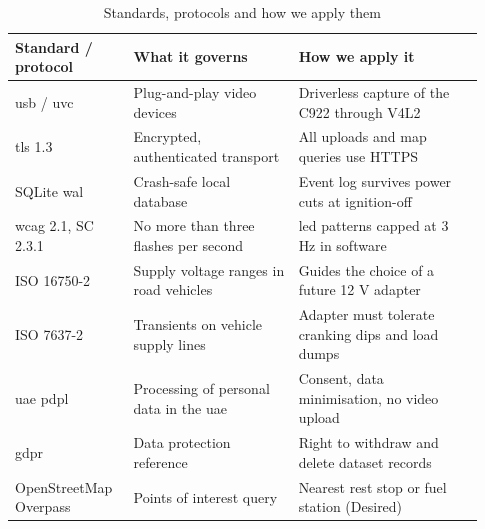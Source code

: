 \begin{table}[htbp]
\centering
\caption{Standards, protocols and how we apply them}
\label{tab:ch3-02}
\footnotesize
\setlength{\tabcolsep}{3pt}
\renewcommand{\arraystretch}{1.15}
\begin{tabular}{|p{0.230\linewidth}|p{0.330\linewidth}|p{0.370\linewidth}|}
\hline
\textbf{Standard / protocol} & \textbf{What it governs} & \textbf{How we apply it} \\
\hline
\gls{usb} / \gls{uvc} \cite{r60} & Plug-and-play video devices & Driverless capture of the C922 through V4L2 \\
\hline
\gls{tls} 1.3 \cite{r54} & Encrypted, authenticated transport & All uploads and map queries use HTTPS \\
\hline
SQLite \gls{wal} \cite{r53} & Crash-safe local database & Event log survives power cuts at ignition-off \\
\hline
\gls{wcag} 2.1, SC 2.3.1 \cite{r55} & No more than three flashes per second & \gls{led} patterns capped at 3 Hz in software \\
\hline
ISO 16750-2 \cite{r58} & Supply voltage ranges in road vehicles & Guides the choice of a future 12 V adapter \\
\hline
ISO 7637-2 \cite{r59} & Transients on vehicle supply lines & Adapter must tolerate cranking dips and load dumps \\
\hline
\gls{uae} \gls{pdpl} \cite{r56} & Processing of personal data in the \gls{uae} & Consent, data minimisation, no video upload \\
\hline
\gls{gdpr} \cite{r57} & Data protection reference & Right to withdraw and delete dataset records \\
\hline
OpenStreetMap Overpass \cite{r68} & Points of interest query & Nearest rest stop or fuel station (Desired) \\
\hline
\end{tabular}
\end{table}
